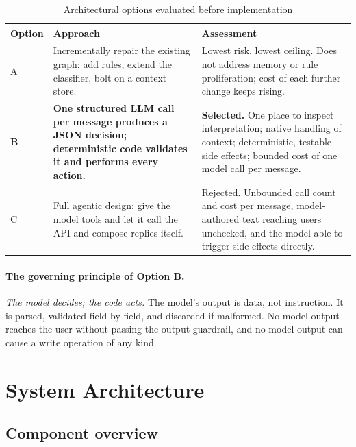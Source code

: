 \documentclass[11pt,a4paper]{article}
\begin{document}
\begin{table}[H]
\centering
\caption{Architectural options evaluated before implementation}
\small
\begin{tabularx}{\textwidth}{@{}l>{\raggedright\arraybackslash}X>{\raggedright\arraybackslash}X@{}}
\toprule
\textbf{Option} & \textbf{Approach} & \textbf{Assessment} \\
\midrule
A & Incrementally repair the existing graph: add rules, extend the classifier, bolt on a
context store. &
Lowest risk, lowest ceiling. Does not address memory or rule proliferation; cost of each
further change keeps rising. \\
\addlinespace
\textbf{B} & \textbf{One structured LLM call per message produces a JSON decision;
deterministic code validates it and performs every action.} &
\textbf{Selected.} One place to inspect interpretation; native handling of context;
deterministic, testable side effects; bounded cost of one model call per message. \\
\addlinespace
C & Full agentic design: give the model tools and let it call the API and compose replies
itself. &
Rejected. Unbounded call count and cost per message, model-authored text reaching users
unchecked, and the model able to trigger side effects directly. \\
\bottomrule
\end{tabularx}
\end{table}

\paragraph{The governing principle of Option B.} \emph{The model decides; the code acts.} The
model's output is data, not instruction. It is parsed, validated field by field, and
discarded if malformed. No model output reaches the user without passing the output
guardrail, and no model output can cause a write operation of any kind.

\section{System Architecture}

\subsection{Component overview}
\end{document}
